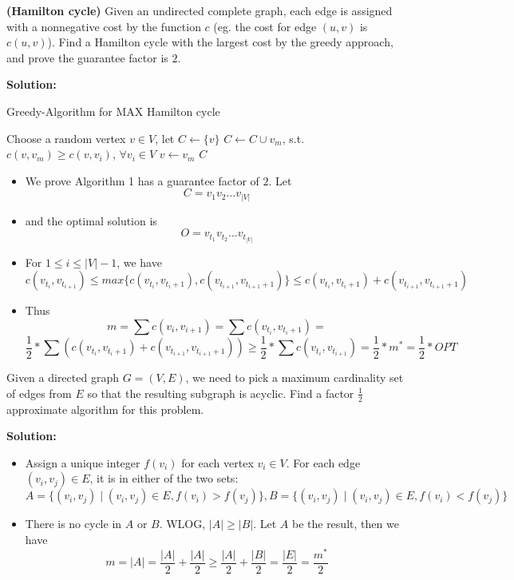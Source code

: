 \documentclass{article}
\newcounter{exercise}
\newcommand{\<}{
    \langle}
\renewcommand{\>}{
    \rangle}
\begin{document}
{\begin{exercise}
	\textbf{(Hamilton cycle)} Given an undirected complete graph, each edge is assigned with a nonnegative cost by the function $c$ (eg. the cost for edge $(u,v)$ is $c(u,v)$). Find a Hamilton cycle with the largest cost by the greedy approach, and prove the guarantee factor is $2$.
\end{exercise}

\textbf{Solution:}

\begin{algorithm}[htb]
\caption{Greedy-Algorithm for MAX Hamilton cycle}
\begin{algorithmic}[1]
\State Choose a random vertex $v\in V$, let
\State $C\leftarrow \{v\}$
	\State $C\leftarrow C\cup {v_m}$, s.t. $c(v,v_m)\geq c(v,v_i)$, $\forall v_i\in V$
	\State $v\leftarrow v_m$
\EndWhile
\State
\Return $C$
\end{algorithmic}
\end{algorithm}

\begin{itemize}
	\item We prove Algorithm 1 has a guarantee factor of $2$. Let 
	$$
	C=v_{1}v_{2}\ldots v_{|V|}
	$$
	\item and the optimal solution is 
	$$
	O=v_{t_1}v_{t_2}\ldots v_{t_{|V|}}
	$$
	\item For $1\leq i\leq |V|-1$, we have
	$$
	c(v_{t_i},v_{t_{i+1}})\leq max\{c(v_{t_i},v_{t_i+1}),c(v_{t_{i+1}},v_{t_{i+1}+1})\}
	\leq c(v_{t_i},v_{t_i+1})+c(v_{t_{i+1}},v_{t_{i+1}+1})
	$$
	\item Thus
	$$
	m=\sum{c(v_i,v_{i+1})}=\sum{c(v_{t_i},v_{t_i+1})} = 
	$$
	$$
	\frac{1}{2}*\sum{(c(v_{t_i},v_{t_i+1}) + c(v_{t_{i+1}},v_{t_{i+1}+1}))}\geq \frac{1}{2}*\sum{c(v_{t_i},v_{t_{i+1}})}=\frac{1}{2}*m^*=\frac{1}{2}*OPT
	$$
\end{itemize}
\newpage




\begin{exercise}
	Given a directed graph $G=(V,E)$, we need to pick a maximum cardinality set of edges from $E$ so that the resulting subgraph is acyclic. Find a factor $\frac{1}{2}$ approximate algorithm for this problem.
\end{exercise}

\textbf{Solution:}
\begin{itemize}
	\item Assign a unique integer $f(v_i)$ for each vertex $v_i\in V$. For each edge $(v_i, v_j)\in E$, it is in either of the two sets:
	$$
	A=\{(v_i, v_j)\mid(v_i, v_j)\in E, f(v_i)>f(v_j)\}, B=\{(v_i, v_j)\mid(v_i, v_j)\in E, f(v_i)<f(v_j)\}
	$$
	\item There is no cycle in $A$ or $B$. WLOG, $|A|\geq |B|$. Let $A$ be the result, then we have
	$$
	m=|A|=\frac{|A|}{2}+\frac{|A|}{2}\geq\frac{|A|}{2}+\frac{|B|}{2}=\frac{|E|}{2}=\frac{m^*}{2}
	$$
\end{itemize}
\newpage





}
\end{document}
